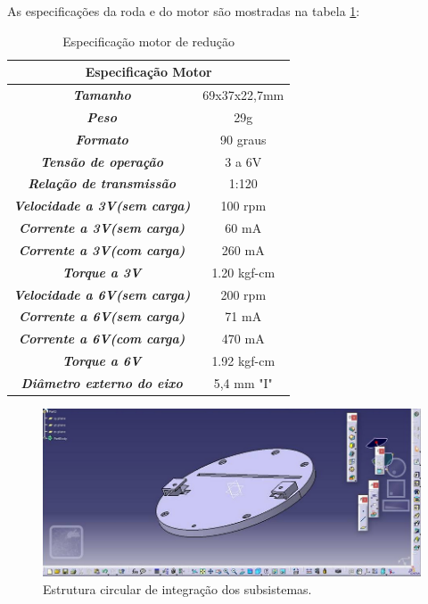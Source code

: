 			As especificações da roda e do motor são mostradas na tabela \ref{tab:motor_red}:

			\begin{table}[H]
				\centering
				\caption{Especificação motor de redução}
				\label{tab:motor_red}
				\begin{tabular}{|c|c|}
					\hline
					\multicolumn{2}{|c|}{\cellcolor[HTML]{C0C0C0}\textbf{Especificação Motor}} \\ \hline
					\textit{\textbf{Tamanho}}                            & 69x37x22,7mm        \\ \hline
					\textit{\textbf{Peso}}                               & 29g                 \\ \hline
					\textit{\textbf{Formato}}                            & 90 graus            \\ \hline
					\textit{\textbf{Tensão de operação}}                 & 3 a 6V              \\ \hline
					\textit{\textbf{Relação de transmissão}}             & 1:120               \\ \hline
					\textit{\textbf{Velocidade a 3V(sem carga)}}         & 100 rpm             \\ \hline
					\textit{\textbf{Corrente a 3V(sem carga)}}           & 60 mA               \\ \hline
					\textit{\textbf{Corrente a 3V(com carga)}}           & 260 mA              \\ \hline
					\textit{\textbf{Torque a 3V}}                        & 1.20 kgf-cm         \\ \hline
					\textit{\textbf{Velocidade a 6V(sem carga)}}         & 200 rpm             \\ \hline
					\textit{\textbf{Corrente a 6V(sem carga)}}           & 71 mA               \\ \hline
					\textit{\textbf{Corrente a 6V(com carga)}}           & 470 mA              \\ \hline
					\textit{\textbf{Torque a 6V}}                        & 1.92 kgf-cm         \\ \hline
					\textit{\textbf{Diâmetro externo do eixo}}           & 5,4 mm "I"          \\ \hline
				\end{tabular}
			\end{table}

			\begin{figure}[H]
				\centering
				\includegraphics[scale=0.5]{figuras/estrutura_circular.png}
				\caption{Estrutura circular de integração dos subsistemas.}
				\label{img:estrutura_circular}
			\end{figure}

